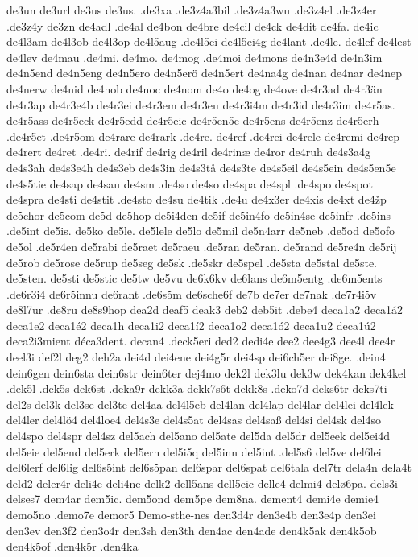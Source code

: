 de3un
de3url
de3us
de3us.
.de3xa
.de3z4a3bil
.de3z4a3wu
.de3z4el
.de3z4er
.de3z4y
de3zn
de4adl
.de4al
de4bon
de4bre
de4cil
de4ck
de4dit
de4fa.
de4ic
de4l3am
de4l3ob
de4l3op
de4l5aug
.de4l5ei
de4l5ei4g
de4lant
.de4le.
de4lef
de4lest
de4lev
de4mau
.de4mi.
de4mo.
de4mog
.de4moi
de4mons
de4n3e4d
de4n3im
de4n5end
de4n5eng
de4n5ero
de4n5erö
de4n5ert
de4na4g
de4nan
de4nar
de4nep
de4nerw
de4nid
de4nob
de4noc
de4nom
de4o
de4og
de4ove
de4r3ad
de4r3än
de4r3ap
de4r3e4b
de4r3ei
de4r3em
de4r3eu
de4r3i4m
de4r3id
de4r3im
de4r5as.
de4r5ass
de4r5eck
de4r5edd
de4r5eic
de4r5en5e
de4r5ens
de4r5enz
de4r5erh
.de4r5et
.de4r5om
de4rare
de4rark
.de4re.
de4ref
.de4rei
de4rele
de4remi
de4rep
de4rert
de4ret
.de4ri.
de4rif
de4rig
de4ril
de4rinæ
de4ror
de4ruh
de4s3a4g
de4s3ah
de4s3e4h
de4s3eb
de4s3in
de4s3tå
de4s3te
de4s5eil
de4s5ein
de4s5en5e
de4s5tie
de4sap
de4sau
de4sm
.de4so
de4so
de4spa
de4spl
.de4spo
de4spot
de4spra
de4sti
de4stit
.de4sto
de4su
de4tik
.de4u
de4x3er
de4xis
de4xt
de4žp
de5chor
de5com
de5d
de5hop
de5i4den
de5if
de5in4fo
de5in4se
de5infr
.de5ins
.de5int
de5is.
de5ko
de5le.
de5lele
de5lo
de5mil
de5n4arr
de5neb
.de5od
de5ofo
de5ol
.de5r4en
de5rabi
de5raet
de5raeu
.de5ran
de5ran.
de5rand
de5re4n
de5rij
de5rob
de5rose
de5rup
de5seg
de5sk
.de5skr
de5spel
.de5sta
de5stal
de5ste.
de5sten.
de5sti
de5stic
de5tw
de5vu
de6k6kv
de6lans
de6m5entg
.de6m5ents
.de6r3i4
de6r5innu
de6rant
.de6s5m
de6sche6f
de7b
de7er
de7nak
.de7r4i5v
de8l7ur
.de8ru
de8s9hop
dea2d
deaf5
deak3
deb2
deb5it
.debe4
deca1a2
deca1á2
deca1e2
deca1é2
deca1h
deca1i2
deca1í2
deca1o2
deca1ó2
deca1u2
deca1ú2
deca2i3mient
déca3dent.
decan4
.deck5eri
ded2
dedi4e
dee2
dee4g3
dee4l
dee4r
deel3i
def2l
deg2
deh2a
dei4d
dei4ene
dei4g5r
dei4sp
dei6ch5er
dei8ge.
.dein4
dein6gen
dein6sta
dein6str
dein6ter
dej4mo
dek2l
dek3lu
dek3w
dek4kan
dek4kel
.dek5l
.dek5s
dek6st
.deka9r
dekk3a
dekk7s6t
dekk8s
.deko7d
deks6tr
deks7ti
del2s
del3k
del3se
del3te
del4aa
del4l5eb
del4lan
del4lap
del4lar
del4lei
del4lek
del4ler
del4lö4
del4loe4
del4s3e
del4s5at
del4sas
del4saß
del4si
del4sk
del4so
del4spo
del4spr
del4sz
del5ach
del5ano
del5ate
del5da
del5dr
del5eek
del5ei4d
del5eie
del5end
del5erk
del5ern
del5i5q
del5inn
del5int
.del5s6
del5ve
del6lei
del6lerf
del6lig
del6s5int
del6s5pan
del6spar
del6spat
del6tala
del7tr
dela4n
dela4t
deld2
deler4r
deli4e
deli4ne
delk2
dell5ans
dell5eic
delle4
delmi4
delø6pa.
dels3i
delses7
dem4ar
dem5ic.
dem5ond
dem5pe
dem8na.
dement4
demi4e
demie4
demo5no
.demo7e
demor5
Demo-sthe-nes
den3d4r
den3e4b
den3e4p
den3ei
den3ev
den3f2
den3o4r
den3sh
den3th
den4ac
den4ade
den4k5ak
den4k5ob
den4k5of
.den4k5r
.den4ka
